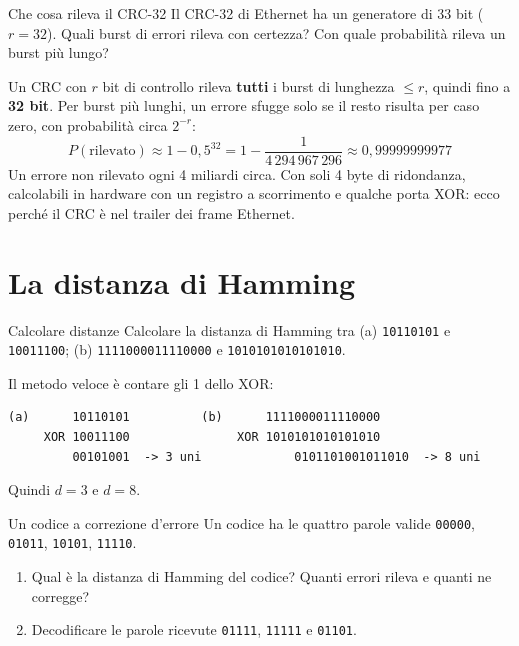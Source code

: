 \begin{esercizio}{Che cosa rileva il CRC-32}
Il CRC-32 di Ethernet ha un generatore di 33 bit ($r = 32$). Quali burst di errori rileva con certezza? Con quale probabilità rileva
un burst più lungo?
\end{esercizio}

\svolgimento
Un CRC con $r$ bit di controllo rileva \textbf{tutti} i burst di lunghezza $\le r$, quindi fino a \textbf{32 bit}. Per burst più lunghi,
un errore sfugge solo se il resto risulta per caso zero, con probabilità circa $2^{-r}$:
$$P(\text{rilevato}) \approx 1 - 0{,}5^{32} = 1 - \frac{1}{4\,294\,967\,296} \approx 0{,}99999999977$$
Un errore non rilevato ogni 4 miliardi circa. Con soli 4 byte di ridondanza, calcolabili in hardware con un registro a scorrimento e
qualche porta XOR: ecco perché il CRC è nel trailer dei frame Ethernet.

\section{La distanza di Hamming}

\begin{esercizio}{Calcolare distanze}
Calcolare la distanza di Hamming tra (a) \texttt{10110101} e \texttt{10011100}; (b) \texttt{1111000011110000} e
\texttt{1010101010101010}.
\end{esercizio}

\svolgimento
Il metodo veloce è contare gli 1 dello XOR:
\begin{lstlisting}[autogobble=false]
(a)      10110101          (b)      1111000011110000
     XOR 10011100               XOR 1010101010101010
         00101001  -> 3 uni             0101101001011010  -> 8 uni
\end{lstlisting}
Quindi $d = 3$ e $d = 8$.

\begin{esercizio}{Un codice a correzione d'errore}
Un codice ha le quattro parole valide \texttt{00000}, \texttt{01011}, \texttt{10101}, \texttt{11110}.
\begin{enumerate}[label=(\alph*)]
    \item Qual è la distanza di Hamming del codice? Quanti errori rileva e quanti ne corregge?
    \item Decodificare le parole ricevute \texttt{01111}, \texttt{11111} e \texttt{01101}.
\end{enumerate}
\end{esercizio}

